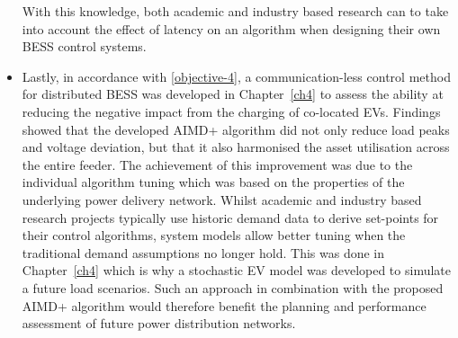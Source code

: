 \begin{itemize}
	With this knowledge, both academic and industry based research can to take into account the effect of latency on an algorithm when designing their own BESS control systems.
	\item
	Lastly, in accordance with \ref{objective-4}, a communication-less control method for distributed BESS was developed in Chapter~\ref{ch4} to assess the ability at reducing the negative impact from the charging of co-located EVs.
	Findings showed that the developed AIMD+ algorithm did not only reduce load peaks and voltage deviation, but that it also harmonised the asset utilisation across the entire feeder.
	The achievement of this improvement was due to the individual algorithm tuning which was based on the properties of the underlying power delivery network.
	Whilst academic and industry based research projects typically use historic demand data to derive set-points for their control algorithms, system models allow better tuning when the traditional demand assumptions no longer hold.
	This was done in Chapter~\ref{ch4} which is why a stochastic EV model was developed to simulate a future load scenarios.
	Such an approach in combination with the proposed AIMD+ algorithm would therefore benefit the planning and performance assessment of future power distribution networks.
\end{itemize}







